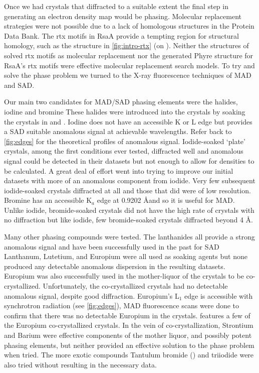  Once we had crystals that diffracted to a suitable extent the final step in generating an electron density map would be phasing. Molecular replacement strategies were not possible due to a lack of homologous structures in the Protein Data Bank. The \ac{rtx}  motifs in RsaA provide a tempting region for structural homology, such as the structure in \cref{fig:intro-rtx} (on ). Neither the structures of solved \ac{rtx} motifs as molecular replacement  nor the generated Phyre structure for RsaA's \ac{rtx} motifs were effective molecular replacement search models. To try and solve the phase problem we turned to the X-ray fluorescence techniques of \ac{MAD} and \ac{SAD}. 

Our main two candidates for \ac{MAD}/\ac{SAD} phasing elements were the halides, iodine and  bromine These halides were introduced into the crystals by soaking the crystals in  and . Iodine does not have an accessible K or L edge but provides a \ac{SAD}  suitable anomalous signal at achievable wavelengths. Refer back to \cref{fig:edges} for the theoretical profiles of anomalous signal. Iodide-soaked `plate' crystals, among the first conditions ever tested, diffracted well and anomalous signal could be detected in their datasets but not enough to allow for densities to be calculated. A great deal of effort went into trying to improve our initial datasets with more of an anomalous component from iodide. Very few subsequent iodide-soaked crystals diffracted at all  and those that did were of low resolution. Bromine has an accessible K$_{a}$ edge at 0.9202 \AA and so it is useful for \ac{MAD}. Unlike iodide, bromide-soaked crystals did not have the high rate of crystals  with no diffraction but like iodide, few bromide-soaked crystals diffracted beyond 4 \AA{}. 

Many other phasing compounds were tested. The lanthanides all provide a strong  anomalous signal and have been successfully used in the past for \ac{SAD} Lanthanum, Lutetium, and Europium were all used as soaking agents but none produced any detectable anomalous dispersion in the resulting datasets. Europium was also successfully used in the mother-liquor of the crystals to be co-crystallized. Unfortunately, the co-crystallized crystals had no detectable anomalous signal, despite good diffraction. Europium's L$_{1}$ edge is accessible with synchrotron radiation (see \cref{fig:edges}), \ac{MAD} fluorescence scans were done to confirm that there was no detectable Europium in the crystals.  features a few of the Europium co-crystallized crystals. In the vein of co-crystallization, Strontium and Barium were effective components of the mother liquor, and possibly potent phasing elements, but neither provided an effective solution to the phase problem when tried. The more exotic compounds Tantulum bromide () and  triiodide were also tried without resulting in the necessary data. 
 
